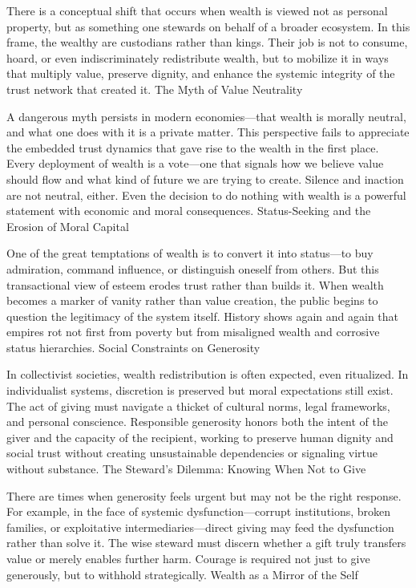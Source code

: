 \documentclass[11pt,oneside]{book}
\begin{document}
There is a conceptual shift that occurs when wealth is viewed not as personal property, but as something one stewards on behalf of a broader ecosystem. In this frame, the wealthy are custodians rather than kings. Their job is not to consume, hoard, or even indiscriminately redistribute wealth, but to mobilize it in ways that multiply value, preserve dignity, and enhance the systemic integrity of the trust network that created it.
The Myth of Value Neutrality

A dangerous myth persists in modern economies—that wealth is morally neutral, and what one does with it is a private matter. This perspective fails to appreciate the embedded trust dynamics that gave rise to the wealth in the first place. Every deployment of wealth is a vote—one that signals how we believe value should flow and what kind of future we are trying to create. Silence and inaction are not neutral, either. Even the decision to do nothing with wealth is a powerful statement with economic and moral consequences.
Status-Seeking and the Erosion of Moral Capital

One of the great temptations of wealth is to convert it into status—to buy admiration, command influence, or distinguish oneself from others. But this transactional view of esteem erodes trust rather than builds it. When wealth becomes a marker of vanity rather than value creation, the public begins to question the legitimacy of the system itself. History shows again and again that empires rot not first from poverty but from misaligned wealth and corrosive status hierarchies.
Social Constraints on Generosity

In collectivist societies, wealth redistribution is often expected, even ritualized. In individualist systems, discretion is preserved but moral expectations still exist. The act of giving must navigate a thicket of cultural norms, legal frameworks, and personal conscience. Responsible generosity honors both the intent of the giver and the capacity of the recipient, working to preserve human dignity and social trust without creating unsustainable dependencies or signaling virtue without substance.
The Steward’s Dilemma: Knowing When Not to Give

There are times when generosity feels urgent but may not be the right response. For example, in the face of systemic dysfunction—corrupt institutions, broken families, or exploitative intermediaries—direct giving may feed the dysfunction rather than solve it. The wise steward must discern whether a gift truly transfers value or merely enables further harm. Courage is required not just to give generously, but to withhold strategically.
Wealth as a Mirror of the Self
\end{document}

